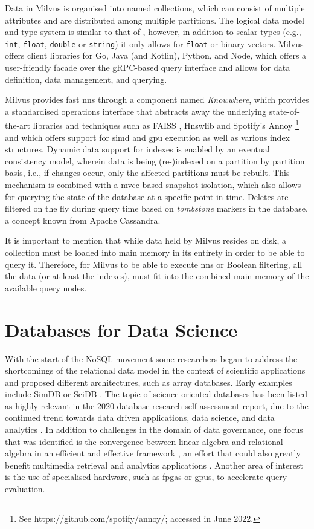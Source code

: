 Data in Milvus is organised into named collections, which can consist of multiple attributes and are distributed among multiple partitions. The logical data model and type system is similar to that of \cottontail{}, however, in addition to scalar types (e.g., \texttt{int}, \texttt{float}, \texttt{double} or \texttt{string}) it only allows for \texttt{float} or binary vectors. Milvus offers client libraries for Go, Java (and Kotlin), Python, and Node, which offers a user-friendly facade over the gRPC-based query interface and allows for data definition, data management, and querying.

Milvus provides fast \acrshort{nns} through a component named \emph{Knowwhere}, which provides a standardised operations interface that abstracts away the underlying state-of-the-art libraries and techniques such as FAISS \cite{Johnson:2019Billion}, Hnswlib \cite{Malkov:2018Efficient} and Spotify's Annoy \footnote{See https://github.com/spotify/annoy/; accessed in June 2022.} and which offers support for \acrshort{simd} and \acrshort{gpu} execution as well as various index structures. Dynamic data support for indexes is enabled by an eventual consistency model, wherein data is being (re-)indexed on a partition by partition basis, i.e., if changes occur, only the affected partitions must be rebuilt. This mechanism is combined with a \acrshort{mvcc}-based snapshot isolation, which also allows for querying the state of the database at a specific point in time. Deletes are filtered on the fly during query time based on \emph{tombstone} markers in the database, a concept known from Apache Cassandra.

It is important to mention that while data held by Milvus resides on disk, a collection must be loaded into main memory in its entirety in order to be able to query it. Therefore, for Milvus to be able to execute \acrshort{nns} or Boolean filtering, all the data (or at least the indexes), must fit into the combined main memory of the available query nodes.

\section{Databases for Data Science}
With the start of the NoSQL movement some researchers began to address the shortcomings of the relational data model in the context of scientific applications and proposed different architectures, such as array databases. Early examples include SimDB \cite{Silva:2010SimDB} or SciDB \cite{Stonebraker:2011Architecture,Stonebraker:2013SciDB}. The topic of science-oriented databases has been listed as highly relevant in the 2020 database research self-assessment report, due to the continued trend towards data driven applications, data science, and data analytics \cite{Abadi:2020Seattle}. In addition to challenges in the domain of data governance, one focus that was identified is the convergence between linear algebra and relational algebra in an efficient and effective framework \cite{Luo:2018Scalable}, an effort that could also greatly benefit multimedia retrieval and analytics applications \cite{Berry:1995Using}. Another area of interest is the use of specialised hardware, such as \acrshort{fpga}s or \acrshort{gpu}s, to accelerate query evaluation.
 
